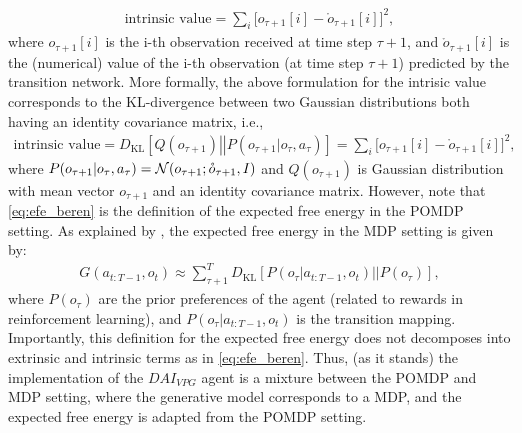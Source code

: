 \documentclass[twoside,11pt]{article}
\let\oldmathcal\mathcal
\renewcommand{\mathcal}[1]{%
  \IfSubStr{ABCDEFGHIJKLMNOPQRSTUVWXYZ}{#1}{\oldmathcal{#1}}{\mathdutchcal{#1}}
}
\newcommand{\kl}[2]{D_{\mathrm{KL}} \left[ \left. \left. #1 \right|\right| #2 \right] }
\begin{document}
\begin{align}
\text{intrinsic value} = \sum_{i} \Big[ o_{\tau+1}[i] - \mathring{o}_{\tau+1}[i] \Big]^2, \label{eq:intrisic_values}
\end{align}
where $o_{\tau+1}[i]$ is the i-th observation received at time step $\tau + 1$, and $\mathring{o}_{\tau+1}[i]$ is the (numerical) value of the i-th observation (at time step $\tau + 1$) predicted by the transition network. More formally, the above formulation for the intrisic value corresponds to the KL-divergence between two Gaussian distributions both having an identity covariance matrix, i.e.,
\begin{align*}
\text{intrinsic value} = \kl{Q(o_{\tau+1})}{P(o_{\tau+1}|o_\tau, a_\tau)} = \sum_{i} \Big[ o_{\tau+1}[i] - \mathring{o}_{\tau+1}[i] \Big]^2,
\end{align*}
where $P(o_{\tau+1}|o_\tau, a_\tau) = \mathcal{N}(o_{\tau+1};\mathring{o}_{\tau+1},I)$ and $Q(o_{\tau+1})$ is Gaussian distribution with mean vector $o_{\tau+1}$ and an identity covariance matrix. However, note that \eqref{eq:efe_beren} is the definition of the expected free energy in the POMDP setting. As explained by \citet{dacosta2020relationship}, the expected free energy in the MDP setting is given by:
\begin{align*}
G(a_{t:T-1},o_t) \approx \sum_{\tau+1}^T \kl{P(o_\tau|a_{t:T-1}, o_t)}{P(o_\tau)},
\end{align*}
where $P(o_\tau)$ are the prior preferences of the agent (related to rewards in reinforcement learning), and $P(o_\tau |a_{t:T-1}, o_t)$ is the transition mapping. Importantly, this definition for the expected free energy does not decomposes into extrinsic and intrinsic terms as in \eqref{eq:efe_beren}. Thus, (as it stands) the implementation of the $DAI_{VPG}$ agent is a mixture between the POMDP and MDP setting, where the generative model corresponds to a MDP, and the expected free energy is adapted from the POMDP setting.
\end{document}
